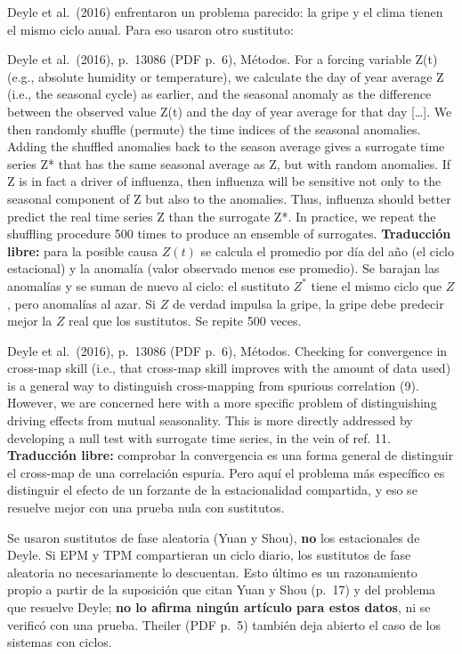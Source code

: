 \documentclass[11pt,openany]{book}
\begin{document}
Deyle et al.\ (2016) enfrentaron un problema parecido: la gripe y el clima tienen el mismo ciclo anual. Para eso usaron otro sustituto:

\begin{cita}{Deyle et al.\ (2016), p.~13086 (PDF p.~6), Métodos.}
For a forcing variable Z(t) (e.g., absolute humidity or temperature), we calculate the day of year average Z (i.e., the seasonal cycle) as earlier, and the seasonal anomaly as the difference between the observed value Z(t) and the day of year average for that day [\dots]. We then randomly shuffle (permute) the time indices of the seasonal anomalies. Adding the shuffled anomalies back to the season average gives a surrogate time series Z* that has the same seasonal average as Z, but with random anomalies. If Z is in fact a driver of influenza, then influenza will be sensitive not only to the seasonal component of Z but also to the anomalies. Thus, influenza should better predict the real time series Z than the surrogate Z*. In practice, we repeat the shuffling procedure 500 times to produce an ensemble of surrogates.
\tcblower
\textbf{Traducción libre:} para la posible causa $Z(t)$ se calcula el promedio por día del año (el ciclo estacional) y la anomalía (valor observado menos ese promedio). Se barajan las anomalías y se suman de nuevo al ciclo: el sustituto $Z^*$ tiene el mismo ciclo que $Z$, pero anomalías al azar. Si $Z$ de verdad impulsa la gripe, la gripe debe predecir mejor la $Z$ real que los sustitutos. Se repite 500 veces.
\end{cita}

\begin{cita}{Deyle et al.\ (2016), p.~13086 (PDF p.~6), Métodos.}
Checking for convergence in cross-map skill (i.e., that cross-map skill improves with the amount of data used) is a general way to distinguish cross-mapping from spurious correlation (9). However, we are concerned here with a more specific problem of distinguishing driving effects from mutual seasonality. This is more directly addressed by developing a null test with surrogate time series, in the vein of ref. 11.
\tcblower
\textbf{Traducción libre:} comprobar la convergencia es una forma general de distinguir el cross-map de una correlación espuria. Pero aquí el problema más específico es distinguir el efecto de un forzante de la estacionalidad compartida, y eso se resuelve mejor con una prueba nula con sustitutos.
\end{cita}

\begin{ojo}
Se usaron sustitutos de fase aleatoria (Yuan y Shou), \textbf{no} los estacionales de Deyle. Si EPM y TPM compartieran un ciclo diario, los sustitutos de fase aleatoria no necesariamente lo descuentan. Esto último es un razonamiento propio a partir de la suposición que citan Yuan y Shou (p.~17) y del problema que resuelve Deyle; \textbf{no lo afirma ningún artículo para estos datos}, ni se verificó con una prueba. Theiler (PDF p.~5) también deja abierto el caso de los sistemas con ciclos.
\end{ojo}
\end{document}
